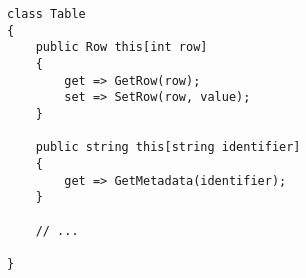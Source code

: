 \begin{frame}[fragile]
\begin{yesblock}
\begin{lstlisting}
class Table
{
    public Row this[int row]
    {
        get => GetRow(row);
        set => SetRow(row, value);
    }

    public string this[string identifier]
    {
        get => GetMetadata(identifier);
    }

    // ...

}
\end{lstlisting}
\end{yesblock}
\end{frame}